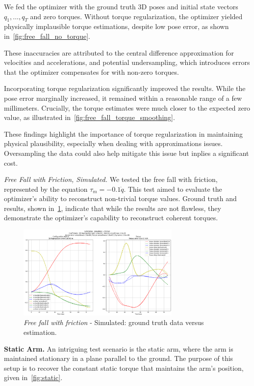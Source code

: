 We fed the optimizer with the ground truth 3D poses and initial state vectors \(q_1, \ldots, q_T\) and zero torques. Without torque 
regularization, the optimizer yielded physically implausible torque estimations, despite low pose error, as shown in~\cref{fig:free_fall_no_torque}.


These inaccuracies are attributed to the central difference approximation for velocities and accelerations, and potential undersampling, which 
introduces errors that the optimizer compensates for with non-zero torques.

Incorporating torque regularization significantly improved the results. While the pose error marginally increased, it remained within a 
reasonable range of a few millimeters. Crucially, the torque estimates were much closer to the expected zero value, as illustrated 
in~\cref{fig:free_fall_torque_smoothing}.


These findings highlight the importance of torque regularization in maintaining physical plausibility, especially when dealing with 
approximations issues. Oversampling the data could also help mitigate this issue but inplies a significant cost.

\noindent\textit{Free Fall with Friction, Simulated.} We tested the free fall with friction, represented by the equation 
\(\tau_m = -0.1\dot{q}\). This test aimed to evaluate the optimizer's ability to reconstruct non-trivial torque values. Ground truth and results, 
shown in~\cref{fig:free_fall_friction}, indicate that while the results are not flawless, 
they demonstrate the optimizer's capability to reconstruct coherent torques.

\begin{figure}
    \centering
    \includegraphics[width=8cm]{figures/inverse_dynamics_friction_case_medium_smoothing.png}
    \caption{\textit{Free fall with friction} - Simulated: ground truth data versus estimation.}
    \label{fig:free_fall_friction}
\end{figure}


\noindent\textbf{Static Arm.} An intriguing test scenario is the static arm, where the arm is 
maintained stationary in a plane parallel to the ground. The purpose of this setup is to recover 
the constant static torque that maintains the arm's position, given in~\cref{fig:static}.

